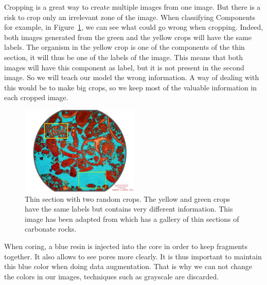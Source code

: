 Cropping is a great way to create multiple images from one image. But there is a risk to crop only an irrelevant zone of the image. When classifying Components for example, in Figure~\ref{fig:crops}, we can see what could go wrong when cropping. Indeed, both images generated from the green and the yellow crops will have the same labels. The organism in the yellow crop is one of the components of the thin section, it will thus be one of the labels of the image. This means that both images will have this component as label, but it is not present in the second image. So we will teach our model the wrong information. A way of dealing with this would be to make big crops, so we keep most of the valuable information in each cropped image.  

\begin{figure}[h]
    \centering
        \includegraphics[width=0.5\textwidth]{figures/03-cropping_example_with2crops}
        \caption[Thin section with 2 random crops]{ Thin section with two random crops. The yellow and green crops have the same labels but contains very different information. This image has been adapted from \cite{section} which has a gallery of thin sections of carbonate rocks. }
        \label{fig:crops}
\end{figure}

When coring, a blue resin is injected into the core in order to keep fragments together. It also allows to see pores more clearly. It is thus important to maintain this blue color when doing data augmentation. That is why we can not change the colors in our images, techniques such as grayscale are discarded.


